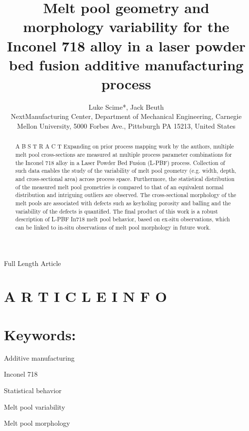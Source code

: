\documentclass[10pt]{article}
\title{Melt pool geometry and morphology variability for the Inconel 718 alloy in a laser powder bed fusion additive manufacturing process }
\author{Luke Scime*, Jack Beuth\\
NextManufacturing Center, Department of Mechanical Engineering, Carnegie Mellon University, 5000 Forbes Ave., Pittsburgh PA 15213, United States}
\date{}
\begin{document}
\maketitle
Full Length Article



\section*{A R T I C L E I N F O}
\section*{Keywords:}
Additive manufacturing

Inconel 718

Statistical behavior

Melt pool variability

Melt pool morphology

\begin{abstract}
A B S T R A C T Expanding on prior process mapping work by the authors, multiple melt pool cross-sections are measured at multiple process parameter combinations for the Inconel 718 alloy in a Laser Powder Bed Fusion (L-PBF) process. Collection of such data enables the study of the variability of melt pool geometry (e.g. width, depth, and cross-sectional area) across process space. Furthermore, the statistical distribution of the measured melt pool geometries is compared to that of an equivalent normal distribution and intriguing outliers are observed. The cross-sectional morphology of the melt pools are associated with defects such as keyholing porosity and balling and the variability of the defects is quantified. The final product of this work is a robust description of L-PBF In718 melt pool behavior, based on ex-situ observations, which can be linked to in-situ observations of melt pool morphology in future work.
\end{abstract}
\end{document}
